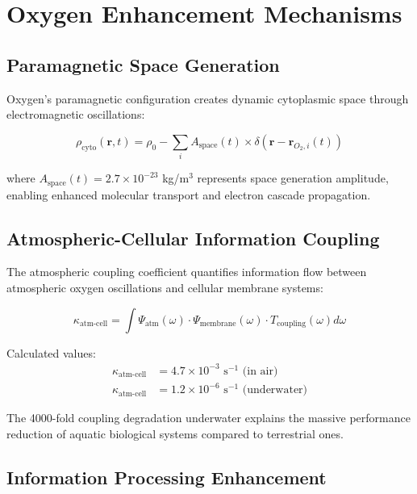\documentclass[12pt,a4paper]{article}
\begin{document}
\section{Oxygen Enhancement Mechanisms}

\subsection{Paramagnetic Space Generation}

Oxygen's paramagnetic configuration creates dynamic cytoplasmic space through electromagnetic oscillations:

\begin{equation}
\rho_{\text{cyto}}(\mathbf{r}, t) = \rho_0 - \sum_i A_{\text{space}}(t) \times \delta(\mathbf{r} - \mathbf{r}_{O_2,i}(t))
\end{equation}

where $A_{\text{space}}(t) = 2.7 \times 10^{-23}$ kg/m$^3$ represents space generation amplitude, enabling enhanced molecular transport and electron cascade propagation.

\subsection{Atmospheric-Cellular Information Coupling}

The atmospheric coupling coefficient quantifies information flow between atmospheric oxygen oscillations and cellular membrane systems:

\begin{equation}
\kappa_{\text{atm-cell}} = \int \Psi_{\text{atm}}(\omega) \cdot \Psi_{\text{membrane}}(\omega) \cdot T_{\text{coupling}}(\omega) d\omega
\end{equation}

Calculated values:
\begin{align}
\kappa_{\text{atm-cell}} &= 4.7 \times 10^{-3} \text{ s}^{-1} \text{ (in air)} \\
\kappa_{\text{atm-cell}} &= 1.2 \times 10^{-6} \text{ s}^{-1} \text{ (underwater)}
\end{align}

The 4000-fold coupling degradation underwater explains the massive performance reduction of aquatic biological systems compared to terrestrial ones.

\subsection{Information Processing Enhancement}
\end{document}
